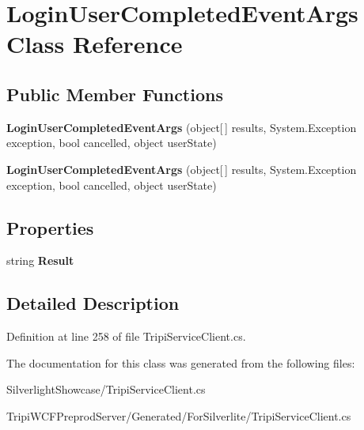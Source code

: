\hypertarget{class_login_user_completed_event_args}{
\section{LoginUserCompletedEventArgs Class Reference}
\label{class_login_user_completed_event_args}
}
\subsection*{Public Member Functions}
\begin{DoxyCompactItemize}
\item 
\hypertarget{class_login_user_completed_event_args_a16c2fd853200cbf0d540dd1078a2627e}{
{\bfseries LoginUserCompletedEventArgs} (object\mbox{[}$\,$\mbox{]} results, System.Exception exception, bool cancelled, object userState)}
\label{class_login_user_completed_event_args_a16c2fd853200cbf0d540dd1078a2627e}

\item 
\hypertarget{class_login_user_completed_event_args_a16c2fd853200cbf0d540dd1078a2627e}{
{\bfseries LoginUserCompletedEventArgs} (object\mbox{[}$\,$\mbox{]} results, System.Exception exception, bool cancelled, object userState)}
\label{class_login_user_completed_event_args_a16c2fd853200cbf0d540dd1078a2627e}

\end{DoxyCompactItemize}
\subsection*{Properties}
\begin{DoxyCompactItemize}
\item 
\hypertarget{class_login_user_completed_event_args_a1d45644e7905eb762a51c718280693c4}{
string {\bfseries Result}}
\label{class_login_user_completed_event_args_a1d45644e7905eb762a51c718280693c4}

\end{DoxyCompactItemize}


\subsection{Detailed Description}


Definition at line 258 of file TripiServiceClient.cs.

The documentation for this class was generated from the following files:\begin{DoxyCompactItemize}
\item 
SilverlightShowcase/TripiServiceClient.cs\item 
TripiWCFPreprodServer/Generated/ForSilverlite/TripiServiceClient.cs\end{DoxyCompactItemize}
